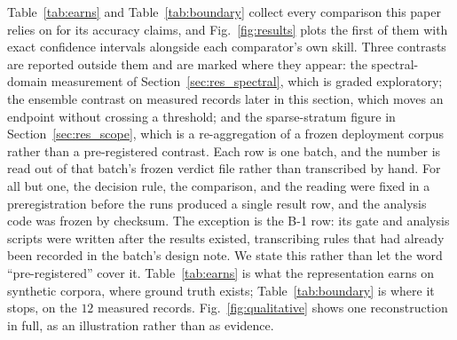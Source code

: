 \documentclass[review]{elsarticle}
\begin{document}

Table~\ref{tab:earns} and Table~\ref{tab:boundary} collect every comparison this
paper relies on for its accuracy claims, and Fig.~\ref{fig:results} plots the first
of them with exact confidence intervals alongside each comparator's own skill. Three
contrasts are reported outside them and are marked where they appear: the
spectral-domain measurement of Section~\ref{sec:res_spectral}, which is graded
exploratory; the ensemble contrast on measured records later in this section, which
moves an endpoint without crossing a threshold; and the sparse-stratum figure in
Section~\ref{sec:res_scope}, which is a re-aggregation of a frozen deployment
corpus rather than a pre-registered contrast.
 Each row is one batch, and the number is read out of that batch's
frozen verdict file rather than transcribed by hand.
For all but one, the decision rule, the comparison, and the reading were fixed in a
preregistration before the runs produced a single result row, and the analysis code
was frozen by checksum. The exception is the B-1 row: its gate and analysis scripts
were written after the results existed, transcribing rules that had already been
recorded in the batch's design note. We state this rather than let the word
``pre-registered'' cover it.
Table~\ref{tab:earns} is what the representation earns on synthetic corpora,
where ground truth exists; Table~\ref{tab:boundary} is where it stops, on the
$12$ measured records. Fig.~\ref{fig:qualitative} shows one reconstruction in full, as an
illustration rather than as evidence.
\end{document}
